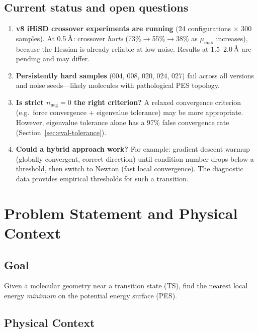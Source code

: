 \documentclass[11pt,a4paper]{article}
\newcommand{\angstrom}{\text{\r{A}}}
\begin{document}
\subsection*{Current status and open questions}

\begin{enumerate}[nosep]
  \item \textbf{v8 iHiSD crossover experiments are running} (24 configurations $\times$ 300 samples). At 0.5\,$\angstrom$: crossover \emph{hurts} (73\%$\to$55\%$\to$38\% as $\mu_\text{max}$ increases), because the Hessian is already reliable at low noise. Results at 1.5--2.0\,$\angstrom$ are pending and may differ.
  \item \textbf{Persistently hard samples} (004, 008, 020, 024, 027) fail across all versions and noise seeds---likely molecules with pathological PES topology.
  \item \textbf{Is strict $n_\text{neg} = 0$ the right criterion?} A relaxed convergence criterion (e.g.\ force convergence + eigenvalue tolerance) may be more appropriate. However, eigenvalue tolerance alone has a 97\% false convergence rate (Section~\ref{sec:eval-tolerance}).
  \item \textbf{Could a hybrid approach work?} For example: gradient descent warmup (globally convergent, correct direction) until condition number drops below a threshold, then switch to Newton (fast local convergence). The diagnostic data provides empirical thresholds for such a transition.
\end{enumerate}

\newpage
\tableofcontents
\newpage

\section{Problem Statement and Physical Context}
\label{sec:problem}

\subsection{Goal}

Given a molecular geometry near a transition state (TS), find the nearest local energy \emph{minimum} on the potential energy surface (PES).

\subsection{Physical Context}
\end{document}
